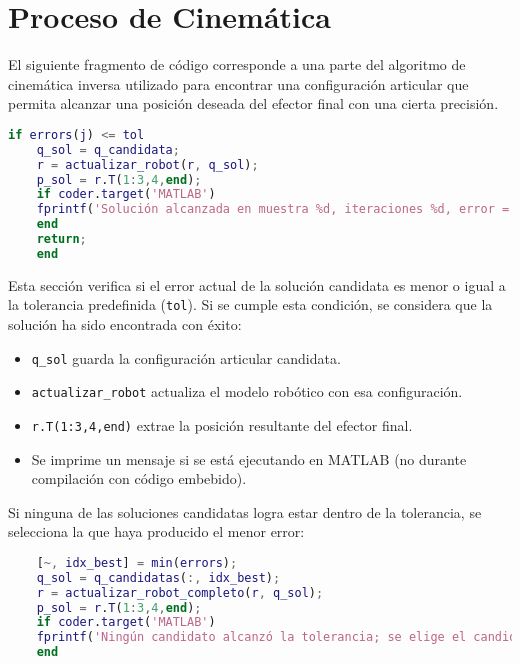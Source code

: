 \section{Proceso de Cinemática} \label{sec:proceso_cinematica}

El siguiente fragmento de código corresponde a una parte del algoritmo de cinemática inversa utilizado para encontrar una configuración articular que permita alcanzar una posición deseada del efector final con una cierta precisión.

\begin{lstlisting}[language=Matlab, caption={Evaluación de la tolerancia y selección de la mejor solución en la cinemática inversa}]
	if errors(j) <= tol
	q_sol = q_candidata;
	r = actualizar_robot(r, q_sol);
	p_sol = r.T(1:3,4,end);
	if coder.target('MATLAB')
	fprintf('Solución alcanzada en muestra %d, iteraciones %d, error = %e\n', j, i, errors(j));
	end
	return;
	end
\end{lstlisting}

Esta sección verifica si el error actual de la solución candidata es menor o igual a la tolerancia predefinida (\texttt{tol}). Si se cumple esta condición, se considera que la solución ha sido encontrada con éxito:

\begin{itemize}
	\item \texttt{q\_sol} guarda la configuración articular candidata.
	\item \texttt{actualizar\_robot} actualiza el modelo robótico con esa configuración.
	\item \texttt{r.T(1:3,4,end)} extrae la posición resultante del efector final.
	\item Se imprime un mensaje si se está ejecutando en MATLAB (no durante compilación con código embebido).
\end{itemize}

Si ninguna de las soluciones candidatas logra estar dentro de la tolerancia, se selecciona la que haya producido el menor error:

\begin{lstlisting}[language=Matlab, caption={Selección de la mejor solución si ninguna cumple con la tolerancia}]
	% Si ningún candidato alcanza la tolerancia, se elige el que tenga el menor error.
	[~, idx_best] = min(errors);
	q_sol = q_candidatas(:, idx_best);
	r = actualizar_robot_completo(r, q_sol);
	p_sol = r.T(1:3,4,end);
	if coder.target('MATLAB')
	fprintf('Ningún candidato alcanzó la tolerancia; se elige el candidato con error = %e\n', min(errors));
	end
\end{lstlisting}

